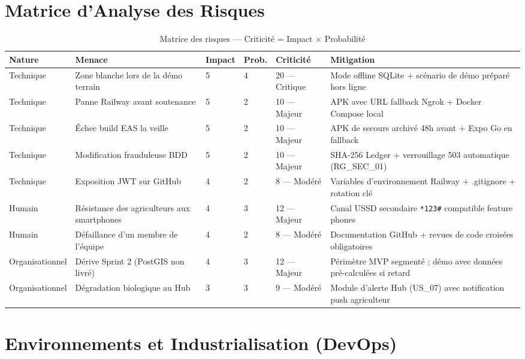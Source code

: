 \documentclass[12pt,a4paper]{report}
\begin{document}
\section{Matrice d'Analyse des Risques}

\begin{table}[H]
\centering
\caption{Matrice des risques — Criticité = Impact $\times$ Probabilité}
\begin{tabularx}{\textwidth}{L{2cm} L{3.5cm} C{1.2cm} C{1.2cm} C{2cm} X}
\toprule
\textbf{Nature} & \textbf{Menace} & \textbf{Impact} & \textbf{Prob.} & \textbf{Criticité} & \textbf{Mitigation} \\
\midrule
Technique & Zone blanche lors de la démo terrain & 5 & 4 & 20 — Critique & Mode offline SQLite + scénario de démo préparé hors ligne \\
Technique & Panne Railway avant soutenance & 5 & 2 & 10 — Majeur & APK avec URL fallback Ngrok + Docker Compose local \\
Technique & Échec build EAS la veille & 5 & 2 & 10 — Majeur & APK de secours archivé 48h avant + Expo Go en fallback \\
Technique & Modification frauduleuse BDD & 5 & 2 & 10 — Majeur & SHA-256 Ledger + verrouillage 503 automatique (RG\_SEC\_01) \\
Technique & Exposition JWT sur GitHub & 4 & 2 & 8 — Modéré & Variables d'environnement Railway + .gitignore + rotation clé \\
Humain & Résistance des agriculteurs aux smartphones & 4 & 3 & 12 — Majeur & Canal USSD secondaire \texttt{*123\#} compatible feature phones \\
Humain & Défaillance d'un membre de l'équipe & 4 & 2 & 8 — Modéré & Documentation GitHub + revues de code croisées obligatoires \\
Organisationnel & Dérive Sprint 2 (PostGIS non livré) & 4 & 3 & 12 — Majeur & Périmètre MVP segmenté ; démo avec données pré-calculées si retard \\
Organisationnel & Dégradation biologique au Hub & 3 & 3 & 9 — Modéré & Module d'alerte Hub (US\_07) avec notification push agriculteur \\
\bottomrule
\end{tabularx}
\end{table}

\section{Environnements et Industrialisation (DevOps)}
\end{document}

